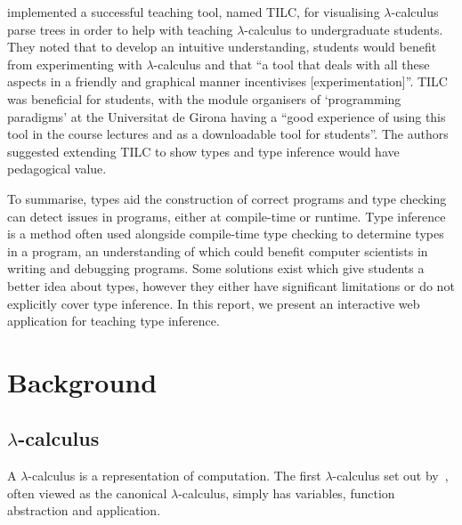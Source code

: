 \documentclass[a4paper,fleqn,oneside,12pt]{report}
\begin{document}
\cite{ref9} implemented a successful teaching tool, named TILC, for visualising $\lambda$-calculus parse trees in order to help with teaching $\lambda$-calculus to undergraduate students. They noted that to develop an intuitive understanding, students would benefit from experimenting with $\lambda$-calculus and that “a tool that deals with all these aspects in a friendly and graphical manner incentivises [experimentation]”. TILC was beneficial for students, with the module organisers of `programming paradigms' at the Universitat de Girona having a ``good experience of using this tool in the course lectures and as a downloadable tool for students''. The authors suggested extending TILC to show types and type inference would have pedagogical value.

To summarise, types aid the construction of correct programs and type checking can detect issues in programs, either at compile-time or runtime. Type inference is a method often used alongside compile-time type checking to determine types in a program, an understanding of which could benefit computer scientists in writing and debugging programs. Some solutions exist which give students a better idea about types, however they either have significant limitations or do not explicitly cover type inference. In this report, we present an interactive web application for teaching type inference.

\chapter{Background}\label{id:h.ebjyqi73zdyo}

\section{\texorpdfstring{$\lambda$-}{Lambda }calculus}\label{id:h.odw4vku9eizz}

A $\lambda$-calculus is a representation of computation. The first $\lambda$-calculus set out by~\cite{ref10}, often viewed as the canonical $\lambda$-calculus, simply has variables, function abstraction and application.
\end{document}
